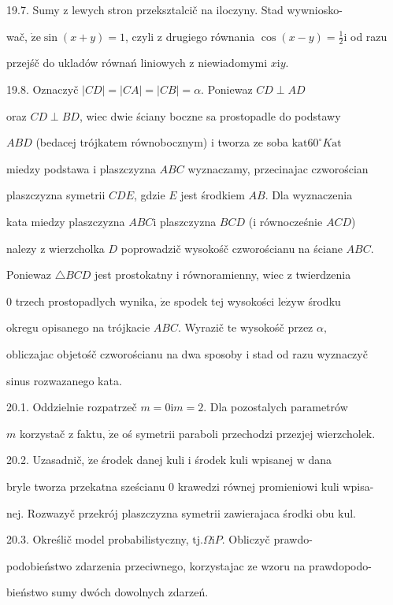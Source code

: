 \documentclass[a4paper,12pt]{article}
\begin{document}
19.7. Sumy $\mathrm{z}$ lewych stron przeksztalcič na iloczyny. Stad wywniosko-

wač, $\dot{\mathrm{z}}\mathrm{e}\sin(x+y)=1$, czyli $\mathrm{z}$ drugiego równania $\displaystyle \cos(x-y)=\frac{1}{2}\mathrm{i}$ od razu

przejśč do ukladów równań liniowych $\mathrm{z}$ niewiadomymi $x\mathrm{i}y.$

19.8. Oznaczyč $|CD| = |CA| = |CB| = \alpha$. Poniewaz $CD \perp AD$

oraz $CD \perp BD$, wiec dwie ściany boczne sa prostopadle do podstawy

$ABD$ (bedacej trójkatem równobocznym) $\mathrm{i}$ tworza ze soba $\mathrm{k}\mathrm{a}\mathrm{t} 60^{\circ} K\mathrm{a}\mathrm{t}$

miedzy podstawa $\mathrm{i}$ plaszczyzna $ABC$ wyznaczamy, przecinajac czworościan

plaszczyzna symetrii $CDE$, gdzie $E$ jest środkiem $AB$. Dla wyznaczenia

kata miedzy plaszczyzna $ABC\mathrm{i}$ plaszczyzna $BCD$ ($\mathrm{i}$ równocześnie $ACD$)

nalezy $\mathrm{z}$ wierzcholka $D$ poprowadzič wysokośč czworościanu na ściane $ABC.$

Poniewaz $\triangle BCD$ jest prostokatny $\mathrm{i}$ równoramienny, wiec $\mathrm{z}$ twierdzenia

$0$ trzech prostopadlych wynika, $\dot{\mathrm{z}}\mathrm{e}$ spodek tej wysokości $\mathrm{l}\mathrm{e}\dot{\mathrm{z}}\mathrm{y} \mathrm{w}$ środku

okregu opisanego na trójkacie $ABC$. Wyrazič $\mathrm{t}\mathrm{e}$ wysokośč przez $\alpha,$

obliczajac objetośč czworościanu na dwa sposoby $\mathrm{i}$ stad od razu wyznaczyč

sinus rozwazanego kata.

20.1. Oddzielnie rozpatrzeč $m=0\mathrm{i}m=2$. Dla pozostalych parametrów

$m$ korzystač $\mathrm{z}$ faktu, $\dot{\mathrm{z}}\mathrm{e}$ oś symetrii paraboli przechodzi przezjej wierzcholek.

20.2. Uzasadnič, $\dot{\mathrm{z}}\mathrm{e}$ środek danej kuli $\mathrm{i}$ środek kuli wpisanej $\mathrm{w}$ dana

bryle tworza przekatna sześcianu $0$ krawedzi równej promieniowi kuli wpisa-

nej. Rozwazyč przekrój plaszczyzna symetrii zawierajaca środki obu $\mathrm{k}\mathrm{u}\mathrm{l}.$

20.3. Określič model probabilistyczny, $\mathrm{t}\mathrm{j}. \Omega \mathrm{i} P$. Obliczyč prawdo-

podobieństwo zdarzenia przeciwnego, korzystajac ze wzoru na prawdopodo-

bieństwo sumy dwóch dowolnych zdarzeń.
\end{document}
